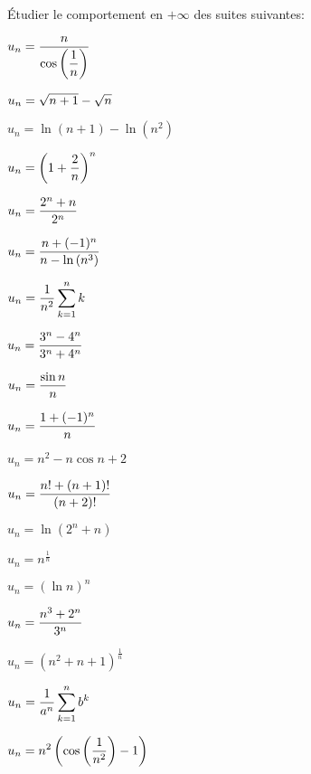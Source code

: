 \documentclass[a4paper, 11pt]{article}
\begin{document}
\begin{exercice} 
\noindent \'Etudier le comportement en $+\infty$ des suites suivantes:
\begin{enumerate}
\begin{minipage}[t]{0.3\textwidth}
\item
$u_n=\displaystyle\frac{n}{\cos{\left(\displaystyle\frac{1}{n}  \right)}}$
\item
$u_n=\displaystyle\sqrt{n+1}-\sqrt{n}$
\item 
$u_n=\ln{(n+1)}-\ln{(n^2)}$
\item  
$u_n=\left(1+\displaystyle\frac{2}{n}\right)^n$
\item  
$u_n=\displaystyle\frac{2^n+n}{2^n}$
\item  $u_n=\displaystyle\frac{n+(-1)^n}{n-\ln{(n^3)}}$
\end{minipage}
\begin{minipage}[t]{0.3\textwidth}
\item  
$u_n=\displaystyle\frac{1}{n^2}\displaystyle \sum\limits_{k=1}^n k$
\item 
$u_n=\displaystyle\frac{3^n-4^n}{3^n+4^n}$
\item  
$u_n=\displaystyle\frac{\sin{n}}{n}$
\item  
$u_n=\displaystyle\frac{1+(-1)^n}{n}$
\item  
$u_n=n^2-n\cos{n}+2$
\item  $u_n=\displaystyle\frac{n!+(n+1)!}{(n+2)!}$
\end{minipage}
\begin{minipage}[t]{0.3\textwidth}
\item 
$u_n=\ln{(2^n+n)}$
\item $u_n=n^{\frac{1}{n}}$  
\item   $u_n=(\ln{n})^n$
\item  $u_n=\displaystyle\frac{n^3+2^n}{3^n}$ 
\item $u_n=(n^2+n+1)^{\frac{1}{n}}$  
\item $u_n=\displaystyle\frac{1}{a^n}\displaystyle \sum\limits_{k=1}^n b^k$  
\item $u_n = \displaystyle n^2 \left(\cos\left(\frac{1}{n^2}\right)-1\right)$
\end{minipage}
\end{enumerate}
\end{exercice}
\end{document}
